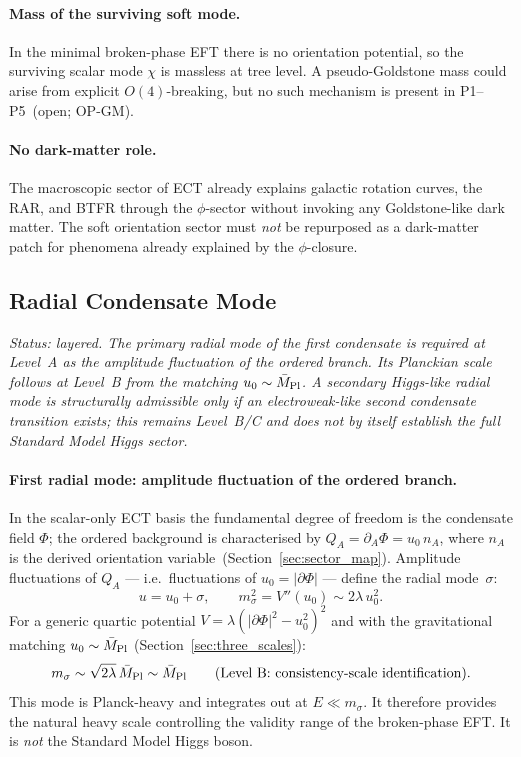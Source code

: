 \documentclass[11pt,a4paper]{article}
\numberwithin{equation}{section}
\begin{document}
\paragraph{Mass of the surviving soft mode.}
In the minimal broken-phase EFT there is no orientation potential, so
the surviving scalar mode $\chi$ is massless at tree level.
A pseudo-Goldstone mass could arise from explicit $O(4)$-breaking,
but no such mechanism is present in P1--P5~(open; OP-GM).

\paragraph{No dark-matter role.}
The macroscopic sector of ECT already explains galactic rotation curves,
the RAR, and BTFR through the $\phi$-sector without invoking any
Goldstone-like dark matter.
The soft orientation sector must \emph{not} be repurposed as a
dark-matter patch for phenomena already explained by the $\phi$-closure.

\subsection{Radial Condensate Mode}
\label{sec:radial_mode}

\textit{Status: layered.
The primary radial mode of the first condensate is required at Level~A
as the amplitude fluctuation of the ordered branch.
Its Planckian scale follows at Level~B from the matching
$u_0\sim\bar{M}_{\rm Pl}$.
A secondary Higgs-like radial mode is structurally admissible only if an
electroweak-like second condensate transition exists; this remains
Level~B/C and does not by itself establish the full Standard Model Higgs
sector.}

\paragraph{First radial mode: amplitude fluctuation of the ordered branch.}
In the scalar-only ECT basis the fundamental degree of freedom is the
condensate field $\Phi$; the ordered background is characterised by
$Q_A=\partial_A\Phi = u_0\,n_A$, where $n_A$ is the derived orientation
variable~(Section~\ref{sec:sector_map}).
Amplitude fluctuations of $Q_A$ --- i.e.\ fluctuations of
$u_0=|\partial\Phi|$ --- define the radial mode~$\sigma$:
\begin{equation}
  u = u_0 + \sigma, \qquad
  m_\sigma^2 = V''(u_0) \sim 2\lambda\,u_0^2.
  \label{eq:sigma_mass_radial}
\end{equation}
For a generic quartic potential $V = \lambda(|\partial\Phi|^2 - u_0^2)^2$
and with the gravitational matching $u_0\sim\bar{M}_{\rm Pl}$
(Section~\ref{sec:three_scales}):
\begin{equation}
  m_\sigma \sim \sqrt{2\lambda}\,\bar{M}_{\rm Pl} \sim \bar{M}_{\rm Pl}
  \qquad\text{(Level~B: consistency-scale identification).}
  \label{eq:sigma_planck}
\end{equation}
This mode is Planck-heavy and integrates out at $E\ll m_\sigma$.
It therefore provides the natural heavy scale controlling the validity
range of the broken-phase EFT.
It is \emph{not} the Standard Model Higgs boson.
\end{document}

